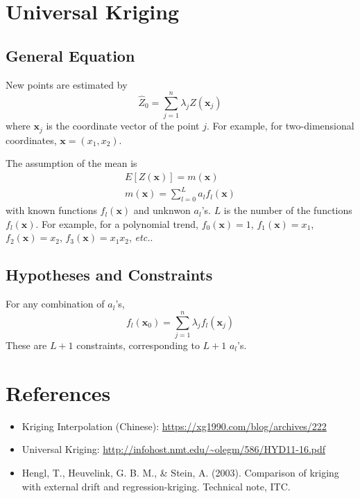 \documentclass{article}
\begin{document}
\section{Universal Kriging}
\subsection{General Equation}
New points are estimated by 
\begin{equation}
    \hat{Z}_0=\sum_{j=1}^n\lambda_jZ(\mathbf{x}_j)
\end{equation}
where $\mathbf{x}_j$ is the coordinate vector of the point $j$. For example, for two-dimensional coordinates, $\mathbf{x}=(x_1, x_2)$.

The assumption of the mean is 
\begin{equation}
    \begin{split}
        E[Z(\mathbf{x})]=m(\mathbf{x}) \\
        m(\mathbf{x})=\sum_{l=0}^La_lf_l(\mathbf{x})
    \end{split}
\end{equation}
with known functions $f_l(\mathbf{x})$ and unknwon $a_l$'s. $L$ is the number of the functions $f_l(\mathbf{x})$. For example, for a polynomial trend, $f_0(\mathbf{x})=1$, $f_1(\mathbf{x})=x_1$, $f_2(\mathbf{x})=x_2$, $f_3(\mathbf{x})=x_1x_2$, \textit{etc.}. 

\subsection{Hypotheses and Constraints}
For any combination of $a_l$'s,
\begin{equation}
    f_l(\mathbf{x}_0)=\sum_{j=1}^n\lambda_jf_l(\mathbf{x}_j)
\end{equation}
These are $L+1$ constraints, corresponding to $L+1$ $a_l$'s. 

\section*{References}
\begin{itemize}
    \item Kriging Interpolation (Chinese): \url{https://xg1990.com/blog/archives/222}
    \item Universal Kriging: \url{http://infohost.nmt.edu/~olegm/586/HYD11-16.pdf}
    \item Hengl, T., Heuvelink, G. B. M., \& Stein, A. (2003). Comparison of kriging with external drift and regression-kriging. Technical note, ITC.
\end{itemize}
\end{document}
